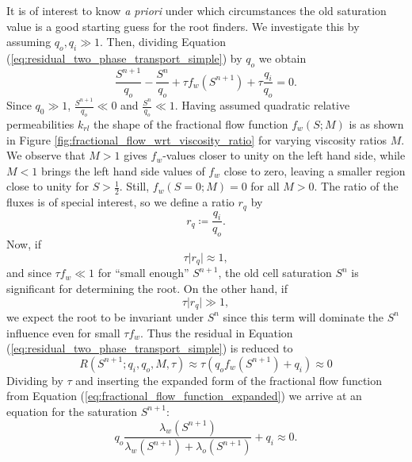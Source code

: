 \clearpage
It is of interest to know \emph{a priori} under which circumstances the old saturation value is a good starting guess for the root finders. We investigate this by assuming $q_o, q_i \gg 1$. Then, dividing Equation (\ref{eq:residual_two_phase_transport_simple}) by $q_o$ we obtain
\begin{equation*}
\frac{S^{n+1}}{q_o} - \frac{S^n}{q_o} + \tau f_w(S^{n+1}) + \tau \frac{q_i}{q_o} = 0.
\end{equation*}
Since $q_0 \gg 1$, $\frac{S^{n+1}}{q_o} \ll 0$ and $\frac{S^n}{q_o} \ll 1$. Having assumed quadratic relative permeabilities $k_{rl}$ the shape of the fractional flow function $f_w(S;M)$ is as shown in Figure \ref{fig:fractional_flow_wrt_viscosity_ratio} for varying viscosity ratios $M$. 
%
We observe that $M > 1$  gives $f_w$-values closer to unity on the left hand side, while $M < 1$ brings the left hand side values of $f_w$ close to zero, leaving a smaller region close to unity for $S > \frac{1}{2}$. Still, $f_w(S = 0;M) = 0$ for all $M > 0$.
The ratio of the fluxes is of special interest, so we define a ratio $r_q$ by
\begin{equation*}
r_q \coloneqq \frac{q_i}{q_o}.
\end{equation*} 
Now, if 
\begin{equation*}
 \tau \lvert r_q \rvert \approx  1,
\end{equation*} 
and since $\tau f_w \ll 1$ for ``small enough'' $S^{n+1}$, the old cell saturation $S^n$ is significant for determining the root. On the other hand, if 
\begin{equation} \label{eq:flux_term_dominance_criterium}
 \tau \lvert r_q \rvert \gg 1,
\end{equation}
we expect the root to be invariant under $S^n$ since this term will dominate the $S^n$ influence even for small $\tau f_w$. Thus the residual in Equation (\ref{eq:residual_two_phase_transport_simple}) is reduced to
\begin{equation*}
R(S^{n+1};q_i,q_o,M,\tau) \approx \tau \left(q_o f_w(S^{n+1}) + q_i\right) \approx 0
\end{equation*}
Dividing by $\tau$ and inserting the expanded form of the fractional flow function from Equation (\ref{eq:fractional_flow_function_expanded}) we arrive at an equation for the saturation $S^{n+1}$:
\begin{equation*}
 q_o \frac{\lambda_w(S^{n+1})}{\lambda_w(S^{n+1}) + \lambda_o(S^{n+1})} + q_i \approx 0.
\end{equation*}
